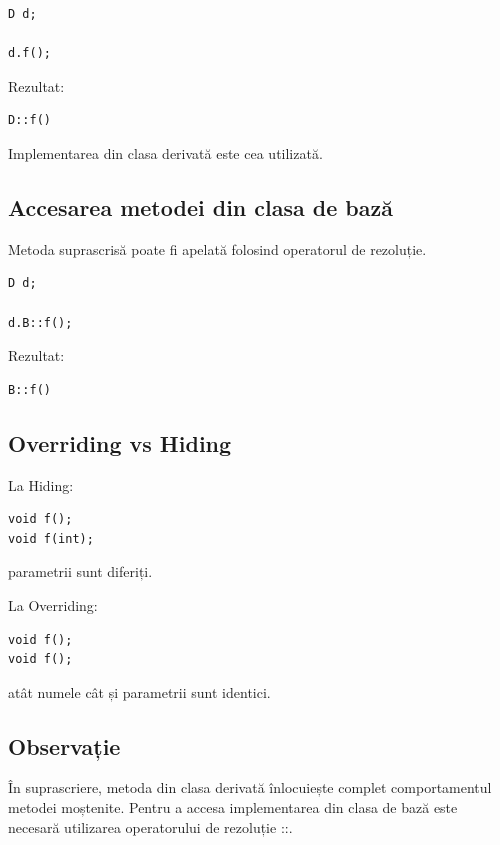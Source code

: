 \documentclass[12pt,a4paper]{article}
\begin{document}
\begin{verbatim}
D d;

d.f();
\end{verbatim}

Rezultat:

\begin{verbatim}
D::f()
\end{verbatim}

Implementarea din clasa derivată este cea utilizată.

\subsection{Accesarea metodei din clasa de bază}

Metoda suprascrisă poate fi apelată folosind operatorul de rezoluție.

\begin{verbatim}
D d;

d.B::f();
\end{verbatim}

Rezultat:

\begin{verbatim}
B::f()
\end{verbatim}

\subsection{Overriding vs Hiding}

La Hiding:

\begin{verbatim}
void f();
void f(int);
\end{verbatim}

parametrii sunt diferiți.

La Overriding:

\begin{verbatim}
void f();
void f();
\end{verbatim}

atât numele cât și parametrii sunt identici.

\subsection{Observație}

În suprascriere, metoda din clasa derivată înlocuiește complet comportamentul metodei moștenite. Pentru a accesa implementarea din clasa de bază este necesară utilizarea operatorului de rezoluție ::.
\end{document}

